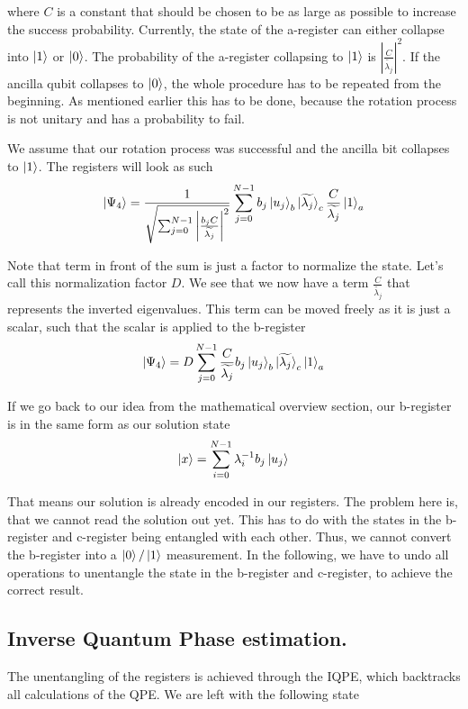 where $C$ is a constant that should be chosen to be as large as possible to increase the success probability.
Currently, the state of the a-register can either collapse into $\ket 1$ or $\ket 0$. 
The probability of the a-register collapsing to $\ket 1$ is $\left|\frac C {\widetilde{\lambda_j}}\right|^2$.
If the ancilla qubit collapses to $\ket 0$, the whole procedure has to be repeated from the beginning. 
As mentioned earlier this has to be done, because the rotation process is not unitary and has a probability to fail.

We assume that our rotation process was successful and the ancilla bit collapses to $\ket 1$. 
The registers will look as such
\begin{equation}
\ket{\Psi_4}= \frac {1} {\sqrt{\sum_{j=0}^{N-1}   \left|  \frac{b_jC} {\widetilde{\lambda_j}}\right|^2   }} 
\sum_{j=0}^{N-1} b_j \ket{u_j}_b \ket{\widetilde{\lambda_j}}_c \frac{C}{\widetilde{\lambda_j}} \ket1_a
\end{equation}

Note that term in front of the sum is just a factor to normalize the state. 
Let's call this normalization factor $D$.
We see that we now have a term $\frac{C}{\widetilde{\lambda_j}}$ that represents the inverted eigenvalues. 
This term can be moved freely as it is just a scalar,  such that the scalar is applied to the b-register
\begin{equation}
\ket{\Psi_4}= D
\sum_{j=0}^{N-1} \frac{C}{\widetilde{\lambda_j}} b_j \ket{u_j}_b \ket{\widetilde{\lambda_j}}_c \ket1_a
\end{equation}

If we go back to our idea from the mathematical overview section, our b-register is in the same form as our solution state
\begin{equation}
\ket{x} = \sum_{i=0}^{N-1} \lambda_i^{-1} b_j\ket{u_j}\\
\end{equation}

That means our solution is already encoded in our registers. 
The problem here is, that we cannot read the solution out yet.
This has to do with the states in the b-register and c-register being entangled with each other. 
Thus, we cannot convert the b-register into a $\ket0 / \ket 1$ measurement.
In the following, we have to undo all operations to unentangle the state in the b-register and c-register, to achieve the correct result.

\subsection{Inverse Quantum Phase estimation.}
The unentangling of the registers is achieved through the IQPE, which backtracks all calculations of the QPE.
We are left with the following state

